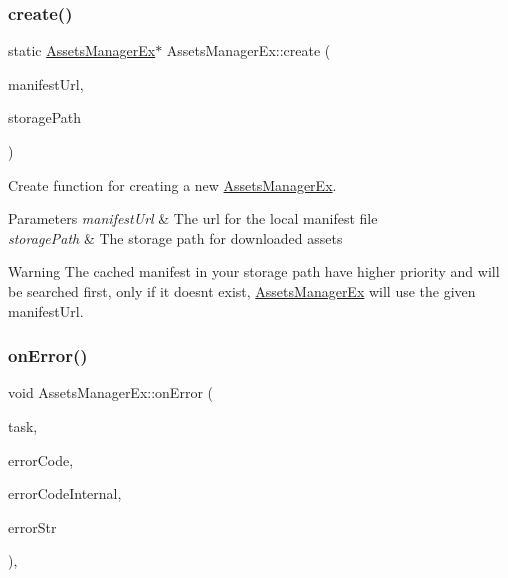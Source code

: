 \subsubsection{\texorpdfstring{create()}{create()}\hspace{0.1cm}{\footnotesize\ttfamily [2/2]}}
{\footnotesize\ttfamily static \hyperlink{classAssetsManagerEx}{Assets\+Manager\+Ex}$\ast$ Assets\+Manager\+Ex\+::create (\begin{DoxyParamCaption}\item[{const std\+::string \&}]{manifest\+Url,  }\item[{const std\+::string \&}]{storage\+Path }\end{DoxyParamCaption})\hspace{0.3cm}{\ttfamily [static]}}



Create function for creating a new \hyperlink{classAssetsManagerEx}{Assets\+Manager\+Ex}. 


\begin{DoxyParams}{Parameters}
{\em manifest\+Url} & The url for the local manifest file \\
\hline
{\em storage\+Path} & The storage path for downloaded assets \\
\hline
\end{DoxyParams}
\begin{DoxyWarning}{Warning}
The cached manifest in your storage path have higher priority and will be searched first, only if it doesn\textquotesingle{}t exist, \hyperlink{classAssetsManagerEx}{Assets\+Manager\+Ex} will use the given manifest\+Url. 
\end{DoxyWarning}
\mbox{\label{classAssetsManagerEx_a66fa811543aef93caff6ce15c8a3ea60}} 
\subsubsection{\texorpdfstring{on\+Error()}{onError()}\hspace{0.1cm}{\footnotesize\ttfamily [1/2]}}
{\footnotesize\ttfamily void Assets\+Manager\+Ex\+::on\+Error (\begin{DoxyParamCaption}\item[{const network\+::\+Download\+Task \&}]{task,  }\item[{int}]{error\+Code,  }\item[{int}]{error\+Code\+Internal,  }\item[{const std\+::string \&}]{error\+Str }\end{DoxyParamCaption})\hspace{0.3cm}{\ttfamily [protected]}, {\ttfamily [virtual]}}



